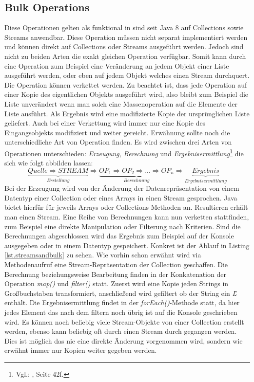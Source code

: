 \subsection{Bulk Operations}
Diese Operationen gelten als funktional in sind seit Java 8 auf Collections sowie Streams anwendbar. Diese Operation müssen nicht separat implementiert werden und können direkt auf Collections oder Streams ausgeführt werden. Jedoch sind nicht zu beiden Arten die exakt gleichen Operation verfügbar. Somit kann durch eine Operation zum Beispiel eine Veränderung an jedem Objekt einer Liste ausgeführt werden, oder eben auf jedem Objekt welches einen Stream durchquert. Die Operation können verkettet werden. Zu beachtet ist, dass jede Operation auf einer Kopie des eigentlichen Objekts ausgeführt wird, also bleibt zum Beispiel die Liste unverändert wenn man solch eine Massenoperation auf die Elemente der Liste ausführt. Als Ergebnis wird eine modifizierte Kopie der ursprünglichen Liste geliefert. Auch bei einer Verkettung wird immer nur eine Kopie des Eingangsobjekts modifiziert und weiter gereicht. Erwähnung sollte noch die unterschiedliche Art von Operation finden. Es wird zwischen drei Arten von Operationen unterschieden: \textit{Erzeugung}, \textit{Berechnung} und \textit{Ergebnisermittlung}\footnote{Vgl.: \cite{Inden.2015}, Seite 42f.} die sich wie folgt abbilden lassen: 
\begin{displaymath}
	\underbrace{Quelle \Rightarrow STREAM}_{Erstellung} \Rightarrow \underbrace{OP_{1} \Rightarrow OP_{2} \Rightarrow ... \Rightarrow OP_{n}}_{Berechnung} \Rightarrow \underbrace{Ergebnis}_{Ergebnisermittlung}
\end{displaymath}
Bei der Erzeugung wird von der Änderung der Datenrepräsentation von einem Datentyp einer Collection oder eines Arrays in einen Stream gesprochen. Java bietet hierfür für jeweils Arrays oder Collections Methoden an. Resultieren erhält man einen Stream. Eine Reihe von Berechnungen kann nun verketten stattfinden, zum Beispiel eine direkte Manipulation oder Filterung nach Kriterien. Sind die Berechnungen abgeschlossen wird das Ergebnis zum Beispiel auf der Konsole ausgegeben oder in einem Datentyp gespeichert. Konkret ist der Ablauf in Listing \ref{lst.streamsandbulk} zu sehen. Wie vorhin schon erwähnt wird via Methodenaufruf eine Stream-Repräsentation der Collection geschaffen. Die Berechnung beziehungsweise Bearbeitung finden in der Konkatenation der Operation \textit{map()} und \textit{filter()} statt. Zuerst wird eine Kopie jeden Strings in Großbuchstaben transformiert, anschließend wird gefiltert ob der String ein \textit{\"L\"} enthält. Die Ergebnisermittlung findet in der \textit{forEach()}-Methode statt, da hier jedes Element das nach dem filtern noch übrig ist auf die Konsole geschrieben wird. Es können noch beliebig viele Stream-Objekte von einer Collection erstellt werden, ebenso kann beliebig oft durch einen Stream durch gegangen werden. Dies ist möglich das nie eine direkte Änderung vorgenommen wird, sondern wie erwähnt immer nur Kopien weiter gegeben werden.
